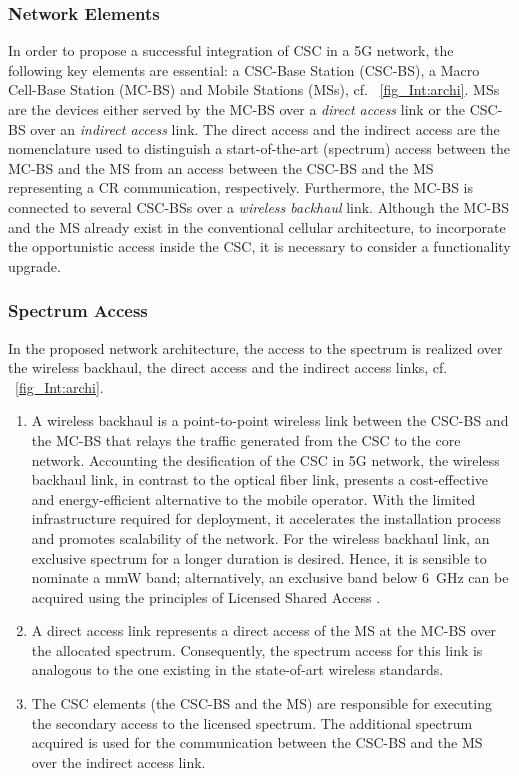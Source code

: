 \subsubsection*{Network Elements}
 In order to propose a successful integration of CSC in a 5G network, the following key elements are essential: a CSC-Base Station (CSC-BS), a Macro Cell-Base Station (MC-BS) and Mobile Stations (MSs), cf. \figurename~\ref{fig_Int:archi}. MSs are the devices either served by the MC-BS over a \textit{direct access} link or the CSC-BS over an \textit{indirect access} link. The direct access and the indirect access are the nomenclature used to distinguish a start-of-the-art (spectrum) access between the MC-BS and the MS from an access between the CSC-BS and the MS representing a CR communication, respectively. Furthermore, the MC-BS is connected to several CSC-BSs over a \textit{wireless backhaul} link. Although the MC-BS and the MS already exist in the conventional cellular architecture, to incorporate the opportunistic access inside the CSC, it is necessary to consider a functionality upgrade.

\subsubsection*{Spectrum Access}
In the proposed network architecture, the access to the spectrum is realized over the wireless backhaul, the direct access and the indirect access links, cf. \figurename~\ref{fig_Int:archi}.
\begin{enumerate}
\item A wireless backhaul is a
point-to-point wireless link between the CSC-BS and the MC-BS that relays the traffic generated from the CSC to the core network. Accounting the desification of the CSC in 5G network, the wireless backhaul link, in contrast to the optical fiber link, presents a cost-effective and energy-efficient alternative to the mobile operator.
With the limited infrastructure required for deployment, it accelerates the installation process and promotes scalability of the network.
For the wireless backhaul link, an exclusive spectrum for a longer duration is desired. Hence, it is sensible to nominate a mmW band; alternatively, an exclusive band below \SI{6}{GHz} can be acquired using the principles of Licensed Shared Access \cite{ETSI13}.

\item A direct access link represents a direct access of the MS at the MC-BS over the allocated spectrum. Consequently, the spectrum access for this link is analogous to the one existing in the state-of-art wireless standards.
\item The CSC elements (the CSC-BS and the MS) are responsible for executing the secondary access to the licensed spectrum. The additional spectrum acquired is used for the communication between the CSC-BS and the MS over the indirect access link.
\end{enumerate}

